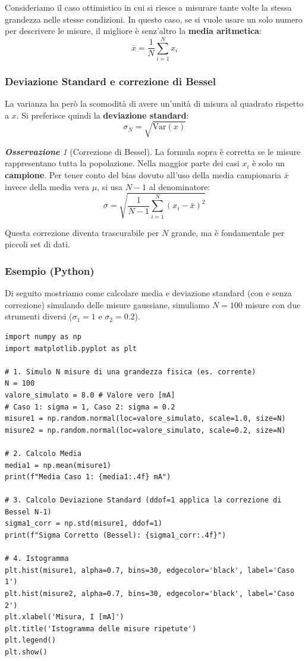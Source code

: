 \documentclass[openany,a4paper,12pt]{book}
\theoremstyle{remark}
\newtheorem{osservazione}{\textbf{\color{ForestGreen}Osservazione}}
\begin{document}
Consideriamo il caso ottimistico in cui si riesce a misurare tante volte la stessa grandezza nelle stesse condizioni. In questo caso, se si vuole usare un solo numero per descrivere le misure, il migliore è senz'altro la \textbf{media aritmetica}:
\begin{equation}
    \bar{x} = \frac{1}{N} \sum_{i=1}^{N} x_i
\end{equation}

\subsubsection{Deviazione Standard e correzione di Bessel}
La varianza ha però la scomodità di avere un'unità di misura al quadrato rispetto a $x$. Si preferisce quindi la \textbf{deviazione standard}:
\[ \sigma_N = \sqrt{\text{Var}(x)} \]

\begin{osservazione}[Correzione di Bessel]
La formula sopra è corretta se le misure rappresentano tutta la popolazione. Nella maggior parte dei casi $x_i$ è solo un \textbf{campione}. Per tener conto del bias dovuto all'uso della media campionaria $\bar{x}$ invece della media vera $\mu$, si usa $N-1$ al denominatore:
\begin{equation}
    \sigma = \sqrt{\frac{1}{N-1} \sum_{i=1}^{N} (x_i - \bar{x})^2}
\end{equation}
\end{osservazione}
Questa correzione diventa trascurabile per $N$ grande, ma è fondamentale per piccoli set di dati.

\subsubsection*{Esempio (Python)}
Di seguito mostriamo come calcolare media e deviazione standard (con e senza correzione) simulando delle misure gaussiane, simuliamo $N=100$ misure con due strumenti diversi ($\sigma_1=1$ e $\sigma_2=0.2$).


\begin{lstlisting}[caption={Calcolo di Media e Deviazione Standard}]
import numpy as np
import matplotlib.pyplot as plt

# 1. Simulo N misure di una grandezza fisica (es. corrente)
N = 100
valore_simulato = 8.0 # Valore vero [mA]
# Caso 1: sigma = 1, Caso 2: sigma = 0.2
misure1 = np.random.normal(loc=valore_simulato, scale=1.0, size=N)
misure2 = np.random.normal(loc=valore_simulato, scale=0.2, size=N)

# 2. Calcolo Media
media1 = np.mean(misure1)
print(f"Media Caso 1: {media1:.4f} mA")

# 3. Calcolo Deviazione Standard (ddof=1 applica la correzione di Bessel N-1)
sigma1_corr = np.std(misure1, ddof=1)
print(f"Sigma Corretto (Bessel): {sigma1_corr:.4f}")

# 4. Istogramma
plt.hist(misure1, alpha=0.7, bins=30, edgecolor='black', label='Caso 1')
plt.hist(misure2, alpha=0.7, bins=30, edgecolor='black', label='Caso 2')
plt.xlabel('Misura, I [mA]')
plt.title('Istogramma delle misure ripetute')
plt.legend()
plt.show()
\end{lstlisting}
\end{document}
